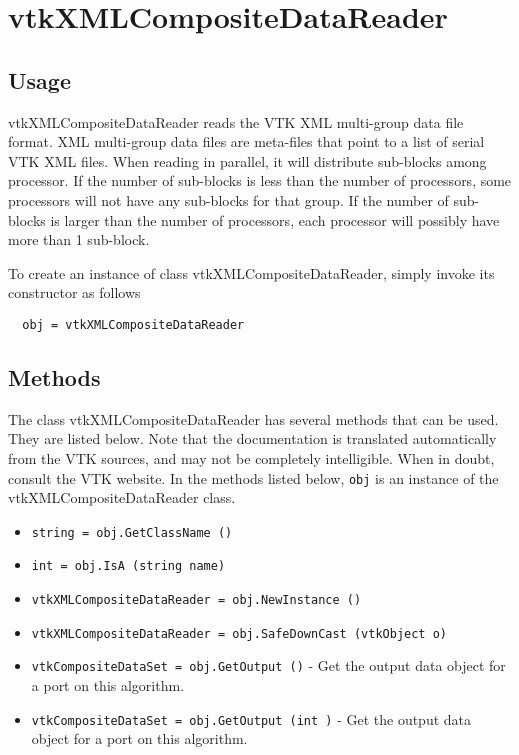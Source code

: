 \section{vtkXMLCompositeDataReader}

\subsection{Usage}

 vtkXMLCompositeDataReader reads the VTK XML multi-group data file
 format. XML multi-group data files are meta-files that point to a list
 of serial VTK XML files. When reading in parallel, it will distribute
 sub-blocks among processor. If the number of sub-blocks is less than
 the number of processors, some processors will not have any sub-blocks
 for that group. If the number of sub-blocks is larger than the
 number of processors, each processor will possibly have more than
 1 sub-block.

To create an instance of class vtkXMLCompositeDataReader, simply
invoke its constructor as follows
\begin{verbatim}
  obj = vtkXMLCompositeDataReader
\end{verbatim}
\subsection{Methods}

The class vtkXMLCompositeDataReader has several methods that can be used.
  They are listed below.
Note that the documentation is translated automatically from the VTK sources,
and may not be completely intelligible.  When in doubt, consult the VTK website.
In the methods listed below, \verb|obj| is an instance of the vtkXMLCompositeDataReader class.
\begin{itemize}
\item  \verb|string = obj.GetClassName ()|

\item  \verb|int = obj.IsA (string name)|

\item  \verb|vtkXMLCompositeDataReader = obj.NewInstance ()|

\item  \verb|vtkXMLCompositeDataReader = obj.SafeDownCast (vtkObject o)|

\item  \verb|vtkCompositeDataSet = obj.GetOutput ()| -  Get the output data object for a port on this algorithm.

\item  \verb|vtkCompositeDataSet = obj.GetOutput (int )| -  Get the output data object for a port on this algorithm.

\end{itemize}

